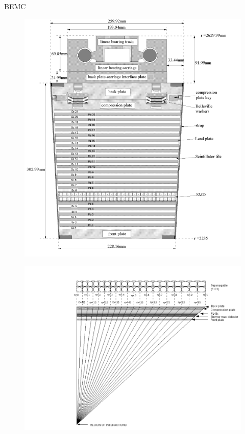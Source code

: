 \documentclass[18pt,notheorems,hyperref={pdfauthor=whatever}]{beamer}
\begin{document}
\begin{frame}{BEMC}
    \begin{minipage}{0.47\textwidth}
        \begin{figure}
            \centering
            \includegraphics[scale=0.3]{images/BEMC_side_view2.png}
        \end{figure}
    \begin{figure}
        \centering
        \includegraphics[scale=0.3]{images/BEMC_side_view.png}

\end{figure}
\end{minipage}
\end{frame}
\end{document}
